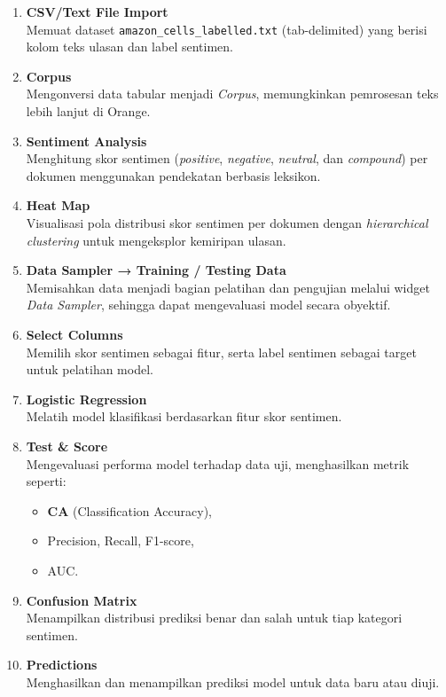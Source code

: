 \begin{enumerate}
	\item \textbf{CSV/Text File Import} \\
	Memuat dataset \texttt{amazon\_cells\_labelled.txt} (tab-delimited) yang berisi kolom teks ulasan dan label sentimen.
	
	\item \textbf{Corpus} \\
	Mengonversi data tabular menjadi \textit{Corpus}, memungkinkan pemrosesan teks lebih lanjut di Orange.
	
	\item \textbf{Sentiment Analysis} \\
	Menghitung skor sentimen (\textit{positive}, \textit{negative}, \textit{neutral}, dan \textit{compound}) per dokumen menggunakan pendekatan berbasis leksikon.
	
	\item \textbf{Heat Map} \\
	Visualisasi pola distribusi skor sentimen per dokumen dengan \textit{hierarchical clustering} untuk mengeksplor kemiripan ulasan.
	
	\item \textbf{Data Sampler → Training / Testing Data} \\
	Memisahkan data menjadi bagian pelatihan dan pengujian melalui widget \textit{Data Sampler}, sehingga dapat mengevaluasi model secara obyektif.
	
	\item \textbf{Select Columns} \\
	Memilih skor sentimen sebagai fitur, serta label sentimen sebagai target untuk pelatihan model.
	
	\item \textbf{Logistic Regression} \\
	Melatih model klasifikasi berdasarkan fitur skor sentimen.
	
	\item \textbf{Test \& Score} \\
	Mengevaluasi performa model terhadap data uji, menghasilkan metrik seperti:
	\begin{itemize}
		\item \textbf{CA} (Classification Accuracy),
		\item Precision, Recall, F1-score,
		\item AUC.
	\end{itemize}
	
	\item \textbf{Confusion Matrix} \\
	Menampilkan distribusi prediksi benar dan salah untuk tiap kategori sentimen.
	
	\item \textbf{Predictions} \\
	Menghasilkan dan menampilkan prediksi model untuk data baru atau diuji.
\end{enumerate}

